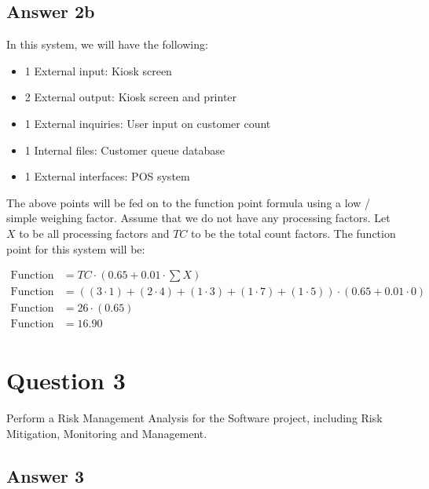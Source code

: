 \documentclass[
  11pt, %
]{assignment}
\begin{document}
\subsection*{Answer 2b}

In this system, we will have the following:
\begin{itemize}
  \item 1 External input: Kiosk screen
  \item 2 External output: Kiosk screen and printer
  \item 1 External inquiries: User input on customer count
  \item 1 Internal files: Customer queue database
  \item 1 External interfaces: POS system
\end{itemize}

The above points will be fed on to the function point formula using a low / simple weighing factor. Assume that we do not have any processing factors. Let \(X\) to be all processing factors and \(TC\) to be the total count factors. The function point for this system will be:

\[
  \begin{aligned}
    \text{Function Point} & = TC \cdot (0.65 + 0.01 \cdot \sum X)                                                               \\
    \text{Function Point} & = ((3 \cdot 1) + (2 \cdot 4) + (1 \cdot 3) + (1 \cdot 7) + (1 \cdot 5)) \cdot (0.65 + 0.01 \cdot 0) \\
    \text{Function Point} & = 26 \cdot (0.65)                                                                                   \\
    \text{Function Point} & = 16.90                                                                                             \\
  \end{aligned}
\]

\section*{Question 3}
\begin{problem}
Perform a Risk Management Analysis for the Software project, including Risk Mitigation, Monitoring and Management.
\end{problem}

\subsection*{Answer 3}
\end{document}
